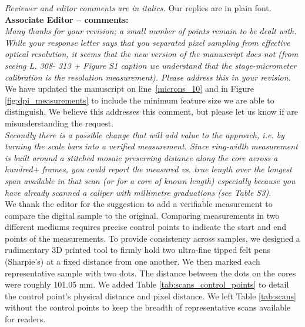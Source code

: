 \documentclass[12pt,a4paper]{article}
\newcommand{\lr}[1]{line~\ref{#1}}
\begin{document}
%



\emph{Reviewer and editor comments are in italics.} Our replies are in plain font.\\ 

{\bf Associate Editor -- comments:} \\

\emph{Many thanks for your revision; a small number of points remain to be dealt with.} \\

\emph{While your response letter says that you separated pixel sampling from effective optical resolution, it seems that the new version of the manuscript does not (from seeing L. 308- 313 + Figure S1 caption we understand that the stage-micrometer calibration is the resolution measurement). Please address this in your revision.} \\

We have updated the manuscript on \lr{microns_10} and in Figure \ref{fig:dpi_measurements} to include the minimum feature size we are able to distinguish. We believe this addresses this comment, but please let us know if are misunderstanding the request. \\ 

\emph{Secondly there is a possible change that will add value to the approach, i.e. by turning the scale bars into a verified measurement. Since ring-width measurement is built around a stitched mosaic preserving distance along the core across a hundred+ frames, you could report the measured vs. true length over the longest span available in that scan (or for a core of known length) especially because you have already scanned a caliper with millimetre graduations (see Table S3).} \\

We thank the editor for the suggestion to add a verifiable measurement to compare the digital sample to the original. Comparing measurements in two different mediums requires precise control points to indicate the start and end points of the measurements. To provide consistency across samples, we designed a rudimentary 3D printed tool to firmly hold two ultra-fine tipped felt pens (Sharpie's) at a fixed distance from one another. We then marked each representative sample with two dots. The distance between the dots on the cores were roughly 101.05 mm. We added Table \ref{tab:scans_control_points} to detail the control point's physical distance and pixel distance. We left Table \ref{tab:scans} without the control points to keep the breadth of representative scans available for readers. \\
\end{document}
